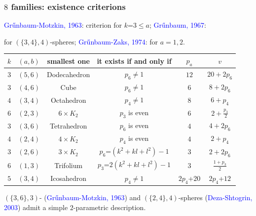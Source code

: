 \documentclass{beamer}
\begin{document}
\begin{frame}\frametitle{$8$ families: existence criterions}
\vspace{-3mm}
\textcolor{blue}{Gr\H{u}nbaum-Motzkin, 1963}: criterion for $k$=$3\le a$;
\textcolor{blue}{Gr\H{u}nbaum, 1967}:

for $(\{3,4\},4)$-spheres;
\textcolor{blue}{Gr\H{u}nbaum-Zaks, 1974}: for $a=1,2$.
{\small
\begin{center}
\begin{tabular}{||c|c||c|c|c|c||}
\hline
\hline
$k$ & $(a,b)$ & smallest one & it exists if and only if & $p_a$ & $v$\\
\hline\hline
$3$ & $(5,6)$ & Dodecahedron & $p_{6} \neq 1$ & $12$
&$20+2p_6$\\  \hline
$3$ & $(4,6)$ & Cube & $p_{6} \neq 1$ & $6$ &$8+2p_6$\\ \hline
$4$ & $(3,4)$ & Octahedron & $p_{4} \neq 1$ &
$8$ &$6+p_4$\\ \hline
$6$ & $(2,3)$ & $6\times K_2$ & $p_3$ is even&
$6$ &$2+\frac{p_3}{2}$\\ \hline \hline
$3$ & $(3,6)$ &Tetrahedron  & $p_6$ is even&
$4$ &$4+2p_6$\\ \hline
$4$ & $(2,4)$ & $4\times K_2$ & $p_4$ is even&
$4$ &$2+p_4$\\ \hline \hline
$3$ & $(2,6)$ &$3\times K_2$  & $p_6$=$(k^2+kl+l^2)-1$&
$3$ &$2+2p_6$\\ \hline
$6$ & $(1,3)$ &Trifolium  & $p_3$=$2(k^2+kl+l^2)-1$&
$3$ &$\frac{1+p_3}{2}$\\ \hline\hline\hline\hline
$5$ & $(3,4)$ &Icosahedron  & $p_4\neq 1$&
$2p_4$+$20$ &$2p_4$+$12$\\ \hline\hline
\end{tabular}
\end{center}
}

$(\{3,6\},3)$- (\textcolor{blue}{Gr\H{u}nbaum-Motzkin, 1963}) and
$(\{2,4\},4)$-spheres (\textcolor{blue}{Deza-Shtogrin, 2003})
admit a simple $2$-parametric
 description.
\end{frame}
\end{document}
